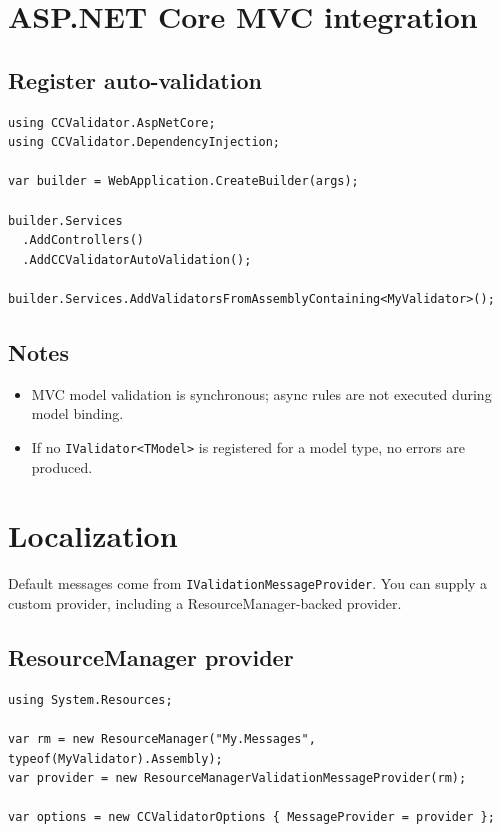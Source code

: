 \documentclass[12pt]{article}
\begin{document}
\section{ASP.NET Core MVC integration}

\subsection{Register auto-validation}
\begin{lstlisting}
using CCValidator.AspNetCore;
using CCValidator.DependencyInjection;

var builder = WebApplication.CreateBuilder(args);

builder.Services
  .AddControllers()
  .AddCCValidatorAutoValidation();

builder.Services.AddValidatorsFromAssemblyContaining<MyValidator>();
\end{lstlisting}

\subsection{Notes}
\begin{itemize}[noitemsep]
  \item MVC model validation is synchronous; async rules are not executed during model binding.
  \item If no \texttt{IValidator<TModel>} is registered for a model type, no errors are produced.
\end{itemize}

\section{Localization}

Default messages come from \texttt{IValidationMessageProvider}. You can supply a custom provider, including a ResourceManager-backed provider.

\subsection{ResourceManager provider}
\begin{lstlisting}
using System.Resources;

var rm = new ResourceManager("My.Messages", typeof(MyValidator).Assembly);
var provider = new ResourceManagerValidationMessageProvider(rm);

var options = new CCValidatorOptions { MessageProvider = provider };
\end{lstlisting}
\end{document}

